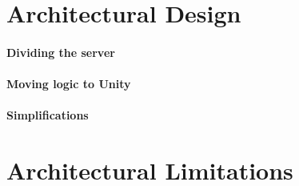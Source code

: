 \section{Architectural Design}
\paragraph{Dividing the server}
\paragraph{Moving logic to Unity}
\paragraph{Simplifications}
\section{Architectural Limitations}

